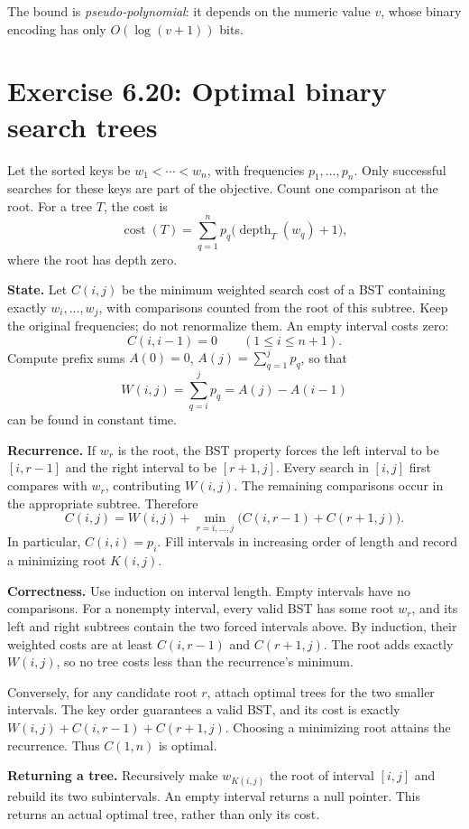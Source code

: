 \documentclass[11pt]{article}
\newcommand{\exercise}[2]{\section*{Exercise #1: #2}}
\begin{document}
The bound is \emph{pseudo-polynomial}: it depends on the numeric value
$v$, whose binary encoding has only $O(\log(v+1))$ bits.

\newpage
\exercise{6.20}{Optimal binary search trees}
Let the sorted keys be $w_1<\cdots<w_n$, with frequencies $p_1,\ldots,p_n$.
Only successful searches for these keys are part of the objective.
Count one comparison at the root. For a tree $T$, the cost is
\[
 \operatorname{cost}(T)=
 \sum_{q=1}^n p_q\bigl(\operatorname{depth}_T(w_q)+1\bigr),
\]
where the root has depth zero.

\textbf{State.}
Let $C(i,j)$ be the minimum weighted search cost of a BST containing
exactly $w_i,\ldots,w_j$, with comparisons counted from the root of
this subtree. Keep the original frequencies; do not renormalize them.
An empty interval costs zero:
\[
 C(i,i-1)=0\qquad(1\le i\le n+1).
\]
Compute prefix sums $A(0)=0$, $A(j)=\sum_{q=1}^j p_q$, so that
\[
 W(i,j)=\sum_{q=i}^j p_q=A(j)-A(i-1)
\]
can be found in constant time.

\textbf{Recurrence.}
If $w_r$ is the root, the BST property forces the left interval to be
$[i,r-1]$ and the right interval to be $[r+1,j]$. Every search in
$[i,j]$ first compares with $w_r$, contributing $W(i,j)$.
The remaining comparisons occur in the appropriate subtree. Therefore
\[
 \boxed{C(i,j)=W(i,j)+
   \min_{r=i,\ldots,j}\bigl(C(i,r-1)+C(r+1,j)\bigr).}
\]
In particular, $C(i,i)=p_i$. Fill intervals in increasing order of
length and record a minimizing root $K(i,j)$.

\textbf{Correctness.}
Use induction on interval length. Empty intervals have no comparisons.
For a nonempty interval, every valid BST has some root $w_r$, and its
left and right subtrees contain the two forced intervals above.
By induction, their weighted costs are at least $C(i,r-1)$ and
$C(r+1,j)$. The root adds exactly $W(i,j)$, so no tree costs less
than the recurrence's minimum.

Conversely, for any candidate root $r$, attach optimal trees for the
two smaller intervals. The key order guarantees a valid BST, and its
cost is exactly $W(i,j)+C(i,r-1)+C(r+1,j)$. Choosing a minimizing
root attains the recurrence. Thus $C(1,n)$ is optimal.

\textbf{Returning a tree.}
Recursively make $w_{K(i,j)}$ the root of interval $[i,j]$ and rebuild
its two subintervals. An empty interval returns a null pointer.
This returns an actual optimal tree, rather than only its cost.

\newpage
\end{document}
